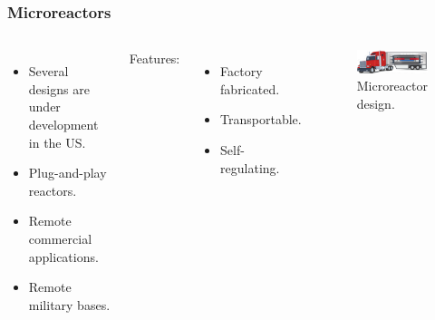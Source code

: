 \begin{frame}
\frametitle{Microreactors}
\begin{columns}
	\column[t]{5cm}
	\begin{itemize}
		\item Several designs are under development in the US.
		\item Plug-and-play reactors.
		\item Remote commercial applications.
		\item Remote military bases.
	\end{itemize}
	\vspace{1cm}
	Features:
	\begin{itemize}
		\item Factory fabricated.
		\item Transportable.
		\item Self-regulating.
	\end{itemize}

    \column[t]{5cm}
	\begin{figure}[htbp!]
		\begin{center}
			\includegraphics[width=5.2cm]{images/microreactor}
		\end{center}
		\caption{Microreactor design.}
	\end{figure}
\end{columns}
\end{frame}

